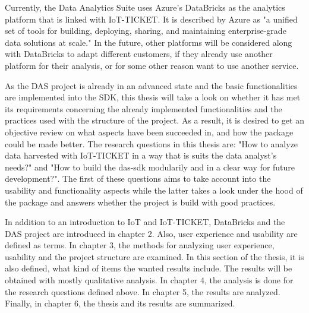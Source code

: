 Currently, the Data Analytics Suite uses Azure's DataBricks as the analytics platform that is linked with IoT-TICKET. It is described by Azure as "a unified set of tools for building, deploying, sharing, and maintaining enterprise-grade data solutions at scale." \cite{Azure2022} In the future, other platforms will be considered along with DataBricks to adapt different customers, if they already use another platform for their analysis, or for some other reason want to use another service.

As the DAS project is already in an advanced state and the basic functionalities are implemented into the SDK, this thesis will take a look on whether it has met its requirements concerning the already implemented functionalities and the practices used with the structure of the project. As a result, it is desired to get an objective review on what aspects have been succeeded in, and how the package could be made better. The research questions in this thesis are: "How to analyze data harvested with IoT-TICKET in a way that is suits the data analyst's needs?" and "How to build the das-sdk modularily and in a clear way for future development?". The first of these questions aims to take account into the usability and functionality aspects while the latter takes a look under the hood of the package and answers whether the project is build with good practices.

In addition to an introduction to IoT and IoT-TICKET, DataBricks and the DAS project are introduced in chapter 2. Also, user experience and usability are defined as terms. In chapter 3, the methods for analyzing user experience, usability and the project structure are examined. In this section of the thesis, it is also defined, what kind of items the wanted results include. The results will be obtained with mostly qualitative analysis. In chapter 4, the analysis is done for the research questions defined above. In chapter 5, the results are analyzed. Finally, in chapter 6, the thesis and its results are summarized.
